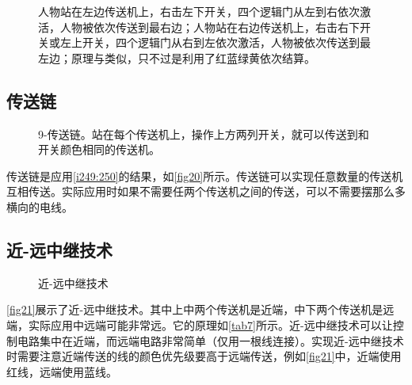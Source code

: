 \begin{figure}[!ht]
  \centering
  \caption{\protect{}人物站在左边传送机上，右击左下开关，四个逻辑门从左到右依次激活，人物被依次传送到最右边；人物站在右边传送机上，右击右下开关或左上开关，四个逻辑门从右到左依次激活，人物被依次传送到最左边；\protect{}原理与\protect{}类似，只不过是利用了红蓝绿黄依次结算。}
  \label{i249:252}
\end{figure}

\subsection{传送链}

\begin{figure}[!ht]
  \centering
  \caption{9-传送链。站在每个传送机上，操作上方两列开关，就可以传送到和开关颜色相同的传送机。}\label{fig20}
\end{figure}

传送链是应用\autoref{i249:250}的结果，如\autoref{fig20}所示。传送链可以实现任意数量的传送机互相传送。实际应用时如果不需要任两个传送机之间的传送，可以不需要摆那么多横向的电线。

\subsection{近-远中继技术}\label{sec16}
\begin{figure}[!ht]
  \centering
  \qquad
  \caption{近-远中继技术}
\end{figure}
\autoref{fig21}展示了近-远中继技术。其中上中两个传送机是近端，中下两个传送机是远端，实际应用中远端可能非常远。它的原理如\autoref{tab7}所示。近-远中继技术可以让控制电路集中在近端，而远端电路非常简单（仅用一根线连接）。实现近-远中继技术时需要注意近端传送的线的颜色优先级要高于远端传送，例如\autoref{fig21}中，近端使用红线，远端使用蓝线。

